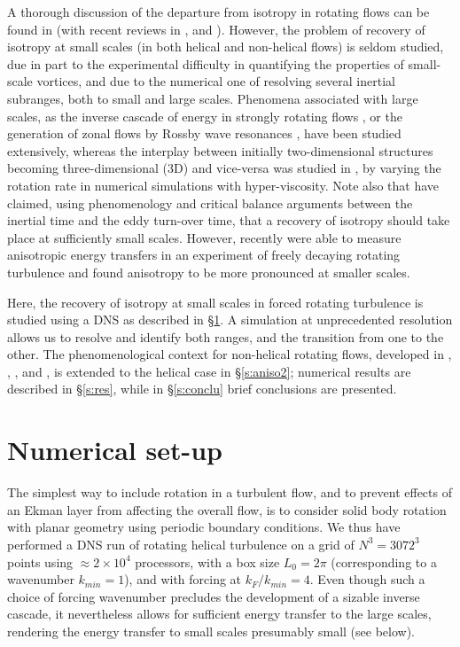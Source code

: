 \documentclass[aps,amsmath,amssymb,floatfix,showpacs]{revtex4}
\begin{document}
A thorough discussion of the departure from isotropy in rotating flows can be found in \cite{cambon_89} (with recent reviews in \citealt{cambon_rev, cambon_04}, and \citealt{bellet_06}). However, the problem of recovery of isotropy at small scales (in both helical and non-helical flows) is seldom studied, due in part to the experimental difficulty in quantifying the properties of small-scale vortices, and due to the numerical one of resolving several inertial subranges, both to small and large scales. Phenomena associated with large scales, as the inverse cascade of energy in strongly rotating flows  \citep{smith96, smith99, chen05}, or the generation of zonal flows by Rossby wave resonances \citep{newell}, have been studied extensively, whereas the interplay between initially two-dimensional structures becoming three-dimensional (3D) and vice-versa was studied in \cite{bartello_CS}, by varying the rotation rate in numerical simulations with hyper-viscosity. Note also that \cite{naza} have claimed, using phenomenology and critical balance arguments between the inertial time and the eddy turn-over time, that a recovery of isotropy should take place at sufficiently small scales. {However, \citet{Lamriben} recently were able to measure anisotropic energy transfers in an experiment of freely decaying rotating turbulence and found anisotropy to be more pronounced at smaller scales.}

Here, the recovery of isotropy at small scales {in forced rotating turbulence} is studied using a DNS as described in \S \ref{s:dns}. A simulation at unprecedented resolution allows us to resolve and identify both ranges, and the transition from one to the other. The phenomenological context for non-helical rotating flows, developed in \cite{dubrulle}, \cite{zeman}, \cite{zhou}, and \cite{canuto}, is  extended to the helical case in \S \ref{s:aniso2}; numerical results are described in \S \ref{s:res}, while in \S \ref{s:conclu} brief conclusions are presented.

\section{Numerical set-up}\label{s:dns}

The simplest way to include rotation in a turbulent flow, and to prevent effects of an Ekman layer from affecting the overall flow, is to consider solid body rotation with planar geometry using periodic boundary conditions. We thus have performed a DNS run of rotating helical turbulence on a grid of $N^3=3072^3$ points using $\approx 2\times 10^4$ processors, with a box size $L_0=2\pi$ (corresponding to a wavenumber $k_{min}=1$), and with forcing at $k_F/k_{min}=4$. Even though such a choice of forcing wavenumber precludes the development of a sizable inverse cascade, it nevertheless allows for sufficient energy transfer to the large scales, rendering the energy transfer to small scales presumably small (see below). 
\end{document}
